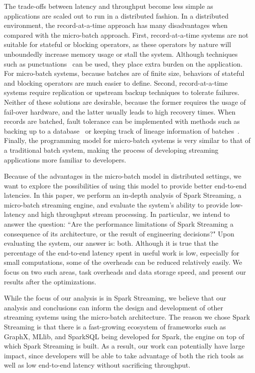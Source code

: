 The trade-offs between latency and throughput become less simple as applications are scaled out to run in a distributed fashion. In a distributed environment, the record-at-a-time approach has many disadvantages when compared with the micro-batch approach.
First, record-at-a-time systems are not suitable for stateful or blocking operators, as these operators by nature will unboundedly increase memory usage or stall the system. Although techniques such as punctuations~\cite{tucker2003exploiting} can be used, they place extra burden on the application. For micro-batch systems, because batches are of finite size, behaviors of stateful and blocking operators are much easier to define.
Second, record-at-a-time systems require replication or upstream backup techniques to tolerate failures. Neither of these solutions are desirable, because the former requires the usage of fail-over hardware, and the latter usually leads to high recovery times. When records are batched, fault tolerance can be implemented with methods such as backing up to a database~\cite{Storm} or keeping track of lineage information of batches~\cite{SparkStreaming}.
Finally, the programming model for micro-batch systems is very similar to that of a traditional batch system, making the process of developing streaming applications more familiar to developers.

Because of the advantages in the micro-batch model in distributed settings, we want to explore the possibilities of using this model to provide better end-to-end latencies. In this paper, we perform an in-depth analysis of Spark Streaming, a micro-batch streaming engine, and evaluate the system's ability to provide low-latency and high throughput stream processing.
In particular, we intend to answer the question: ``Are the performance limitations of Spark Streaming a consequence of its architecture, or the result of engineering decisions?"
Upon evaluating the system, our answer is: both. Although it is true that the percentage of the end-to-end latency spent in useful work is low, especially for small computations, some of the overheads can be reduced relatively easily. We focus on two such areas, task overheads and data storage speed, and present our results after the optimizations.

While the focus of our analysis is in Spark Streaming, we believe that our analysis and conclusions can inform the design and development of other streaming systems using the micro-batch architecture. The reason we chose Spark Streaming is that there is a fast-growing ecosystem of frameworks such as GraphX, MLlib, and SparkSQL being developed for Spark, the engine on top of which Spark Streaming is built. As a result, our work can potentially have large impact, since developers will be able to take advantage of both the rich tools as well as low end-to-end latency without sacrificing throughput.

